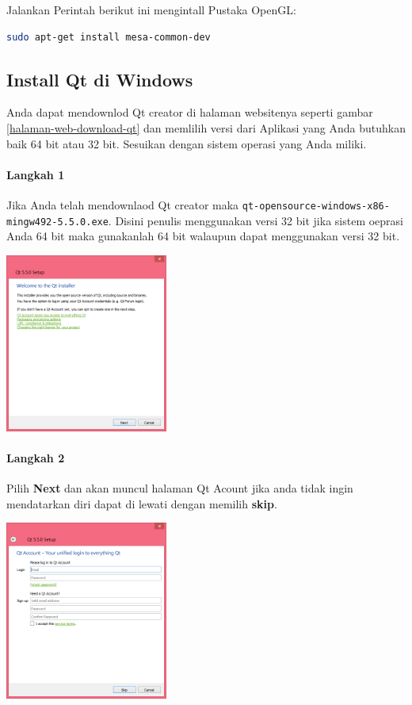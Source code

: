 Jalankan Perintah berikut ini mengintall Pustaka OpenGL:

\begin{lstlisting}[language=sh, numbers=none]
sudo apt-get install mesa-common-dev
\end{lstlisting}

\subsection{Install Qt di Windows}\label{install-qt-di-windows}

Anda dapat mendownlod Qt creator di halaman websitenya seperti gambar \ref{halaman-web-download-qt} dan memlilih versi
dari Aplikasi yang Anda butuhkan baik 64 bit atau 32 bit. Sesuikan
dengan sistem operasi yang Anda miliki.

\paragraph{Langkah 1}
  Jika Anda telah mendownlaod Qt creator maka
  \texttt{qt-opensource-windows-x86-mingw492-5.5.0.exe}. Disini penulis
  menggunakan versi 32 bit jika sistem oeprasi Anda 64 bit maka
  gunakanlah 64 bit walaupun dapat menggunakan versi 32 bit.
 
\begin{center}
	 \includegraphics[width=0.4\textwidth]{images/install-qt-1.png}
\end{center}
 



\paragraph{Langkah 2}
  Pilih \textbf{Next} dan akan muncul halaman Qt Acount jika anda tidak
  ingin mendatarkan diri dapat di lewati dengan memilih \textbf{skip}.

\begin{center}
	 \includegraphics[width=0.4\textwidth]{images/install-qt-2.png}
\end{center}
 


